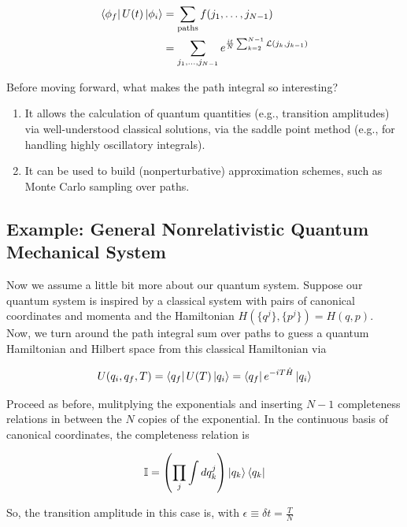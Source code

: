 \begin{align}
\bra{\phi_f} U(t) \ket{\phi_i} &= \sum_{\text{paths}} f(j_1, \dots , j_{N-1}) \\
&= \sum_{j_1,\dots,j_{N-1}} e^{\frac{it}{N} \sum_{k=2}^{N-1} \mathcal{L} (j_k, j_{k-1}) } 
\end{align}

\noindent Before moving forward, what makes the path integral so interesting?

\begin{enumerate}
\item It allows the calculation of quantum quantities (e.g., transition amplitudes) via well-understood classical solutions, via the saddle point method (e.g., for handling highly oscillatory integrals).
\item It can be used to build (nonperturbative) approximation schemes, such as Monte Carlo sampling over paths.
\end{enumerate}

\subsection*{Example: General Nonrelativistic Quantum Mechanical System}

\noindent Now we assume a little bit more about our quantum system. Suppose our quantum system is inspired by a classical system with pairs of canonical coordinates and momenta and the Hamiltonian $H(\{q^j\},\{p^j\}) = H(q,p)$. \\

\noindent Now, we turn around the path integral sum over paths to guess a quantum Hamiltonian and Hilbert space from this classical Hamiltonian via

\begin{equation}
U(q_i, q_f, T) = \bra{q_f} U(T) \ket{q_i} = \bra{q_f} e^{-iT\hat{H}} \ket{q_i}
\end{equation}

\noindent Proceed as before, mulitplying the exponentials and inserting $N-1$ completeness relations in between the $N$ copies of the exponential. In the continuous basis of canonical coordinates, the completeness relation is

\begin{equation}
\mathbb{I} = \left( \prod_j \int dq_k^j \right) \ket{q_k} \bra{q_k}
\end{equation}

\noindent So, the transition amplitude in this case is, with $\epsilon \equiv \delta t = \frac{T}{N}$

